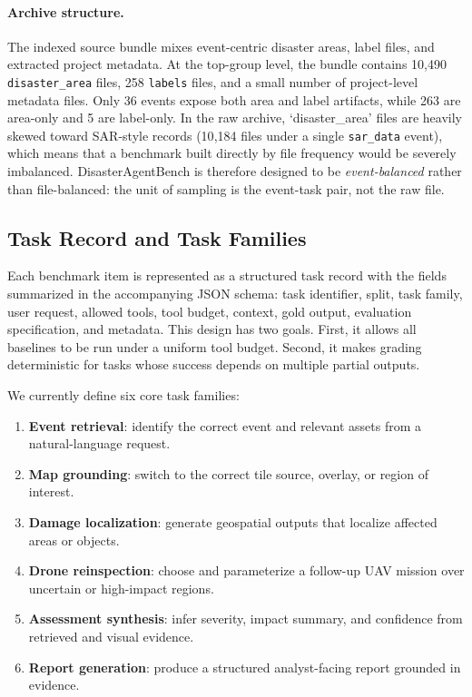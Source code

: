\documentclass{article}
\newcommand{\datasetsarfiles}{10{,}184}
\begin{document}
\paragraph{Archive structure.}
The indexed source bundle mixes event-centric disaster areas, label files, and extracted project metadata. At the top-group level, the bundle contains 10{,}490 \texttt{disaster\_area} files, 258 \texttt{labels} files, and a small number of project-level metadata files. Only 36 events expose both area and label artifacts, while 263 are area-only and 5 are label-only. In the raw archive, `disaster\_area' files are heavily skewed toward SAR-style records (\datasetsarfiles{} files under a single \texttt{sar\_data} event), which means that a benchmark built directly by file frequency would be severely imbalanced. DisasterAgentBench is therefore designed to be \emph{event-balanced} rather than file-balanced: the unit of sampling is the event-task pair, not the raw file.

\subsection{Task Record and Task Families}

Each benchmark item is represented as a structured task record with the fields summarized in the accompanying JSON schema: task identifier, split, task family, user request, allowed tools, tool budget, context, gold output, evaluation specification, and metadata. This design has two goals. First, it allows all baselines to be run under a uniform tool budget. Second, it makes grading deterministic for tasks whose success depends on multiple partial outputs.

We currently define six core task families:
\begin{enumerate}[leftmargin=1.2em]
    \item \textbf{Event retrieval}: identify the correct event and relevant assets from a natural-language request.
    \item \textbf{Map grounding}: switch to the correct tile source, overlay, or region of interest.
    \item \textbf{Damage localization}: generate geospatial outputs that localize affected areas or objects.
    \item \textbf{Drone reinspection}: choose and parameterize a follow-up UAV mission over uncertain or high-impact regions.
    \item \textbf{Assessment synthesis}: infer severity, impact summary, and confidence from retrieved and visual evidence.
    \item \textbf{Report generation}: produce a structured analyst-facing report grounded in evidence.
\end{enumerate}
\end{document}
